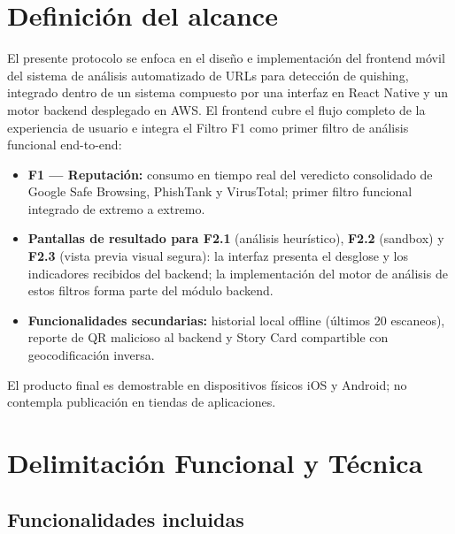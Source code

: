 \section{Definición del alcance}

El presente protocolo se enfoca en el diseño e implementación del frontend móvil del sistema de análisis automatizado de URLs para detección de quishing, integrado dentro de un sistema compuesto por una interfaz en React Native y un motor backend desplegado en AWS. El frontend cubre el flujo completo de la experiencia de usuario e integra el Filtro F1 como primer filtro de análisis funcional end-to-end:

\begin{itemize}
    \item \textbf{F1 --- Reputación:} consumo en tiempo real del veredicto consolidado de Google Safe Browsing, PhishTank y VirusTotal; primer filtro funcional integrado de extremo a extremo.
    \item \textbf{Pantallas de resultado para F2.1} (análisis heurístico), \textbf{F2.2} (sandbox) y \textbf{F2.3} (vista previa visual segura): la interfaz presenta el desglose y los indicadores recibidos del backend; la implementación del motor de análisis de estos filtros forma parte del módulo backend.
    \item \textbf{Funcionalidades secundarias:} historial local offline (últimos 20 escaneos), reporte de QR malicioso al backend y Story Card compartible con geocodificación inversa.
\end{itemize}

El producto final es demostrable en dispositivos físicos iOS y Android; no contempla publicación en tiendas de aplicaciones.

\section{Delimitación Funcional y Técnica}

\subsection{Funcionalidades incluidas}

